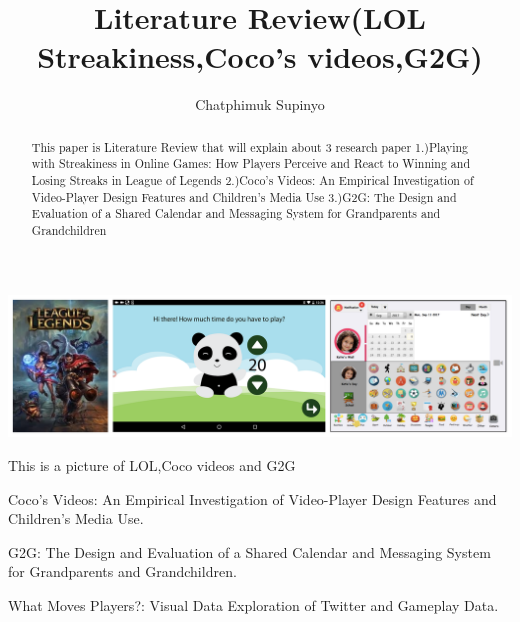 \documentclass[sigchi, review]{acmart}
\begin{document}
\title{Literature Review(LOL Streakiness,Coco's videos,G2G)}



\author{Chatphimuk Supinyo}



\begin{abstract}
This paper is Literature Review that will explain about 3 research paper 1.)Playing with Streakiness in Online Games: How Players
Perceive and React to Winning and Losing Streaks in League of Legends 2.)Coco’s Videos: An Empirical Investigation of Video-Player
Design Features and Children's Media Use 3.)G2G: The Design and Evaluation of a Shared Calendar and
Messaging System for Grandparents and Grandchildren  
\end{abstract}




\begin{teaserfigure}
  \includegraphics[width=\textwidth]{sampleteaser}
  \caption{This is a picture of LOL,Coco videos and G2G}
  \label{fig:teaser}
\end{teaserfigure}


\maketitle



\cite{hiniker2018coco} Coco’s Videos: An Empirical Investigation of Video-Player Design Features and Children's Media Use.


\cite{forghani2018g2g}G2G: The Design and Evaluation of a Shared Calendar and Messaging System for Grandparents and Grandchildren.


\cite{drescher2018moves} What Moves Players?: Visual Data Exploration of Twitter and Gameplay Data.


\end{document}

